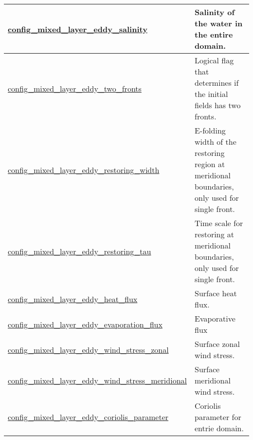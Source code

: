 {\begin{center}
\begin{longtable}{| p{2.0in} || p{4.0in} |}
    \hline
    \hyperref[subsec:nm_sec_config_mixed_layer_eddy_salinity]{config\_mixed\_layer\_eddy\_\-salinity} & Salinity of the water in the entire domain. \\
    \hline
    \hyperref[subsec:nm_sec_config_mixed_layer_eddy_two_fronts]{config\_mixed\_layer\_eddy\_two\_\-fronts} & Logical flag that determines if the initial fields has two fronts. \\
    \hline
    \hyperref[subsec:nm_sec_config_mixed_layer_eddy_restoring_width]{config\_mixed\_layer\_eddy\_\-restoring\_width} & E-folding width of the restoring region at meridional boundaries, only used for single front. \\
    \hline
    \hyperref[subsec:nm_sec_config_mixed_layer_eddy_restoring_tau]{config\_mixed\_layer\_eddy\_\-restoring\_tau} & Time scale for restoring at meridional boundaries, only used for single front. \\
    \hline
    \hyperref[subsec:nm_sec_config_mixed_layer_eddy_heat_flux]{config\_mixed\_layer\_eddy\_\-heat\_flux} & Surface heat flux. \\
    \hline
    \hyperref[subsec:nm_sec_config_mixed_layer_eddy_evaporation_flux]{config\_mixed\_layer\_eddy\_\-evaporation\_flux} & Evaporative flux \\
    \hline
    \hyperref[subsec:nm_sec_config_mixed_layer_eddy_wind_stress_zonal]{config\_mixed\_layer\_eddy\_\-wind\_stress\_zonal} & Surface zonal wind stress. \\
    \hline
    \hyperref[subsec:nm_sec_config_mixed_layer_eddy_wind_stress_meridional]{config\_mixed\_layer\_eddy\_\-wind\_stress\_meridional} & Surface meridional wind stress. \\
    \hline
    \hyperref[subsec:nm_sec_config_mixed_layer_eddy_coriolis_parameter]{config\_mixed\_layer\_eddy\_\-coriolis\_parameter} & Coriolis parameter for entrie domain. \\
    \hline
\end{longtable}
\end{center}
}
